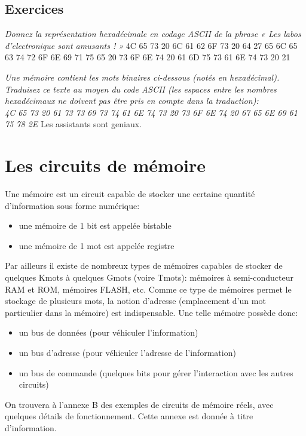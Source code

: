\subsection{Exercices}
{
\textit{Donnez la représentation hexadécimale en codage ASCII de la phrase « Les labos d’electronique sont amusants ! »}
}
{%
4C 65 73 20 6C 61 62 6F 73 20 64 27 65 6C 65 63 74 72 6F 6E 69 71 75 65 20 73 6F 6E 74 20 61 6D 75 73 61 6E 74 73 20 21
}

{
\textit{Une mémoire contient les mots binaires ci-dessous (notés en hexadécimal). Traduisez ce texte au moyen du code ASCII (les espaces entre les nombres hexadécimaux ne doivent pas être pris en compte dans la traduction):\\
4C 65 73 20 61 73 73 69 73 74 61 6E 74 73 20 73 6F 6E 74 20 67 65 6E 69 61 75 78 2E}
}
{%
Les assistants sont geniaux.
}


\section{Les circuits de mémoire}
Une mémoire est un circuit capable de stocker une certaine quantité d'information sous forme numérique:
\begin{itemize}
\item une mémoire de 1 bit est appelée bistable
\item une mémoire de 1 mot est appelée registre
\end{itemize}

Par ailleurs il existe de nombreux types de mémoires capables de stocker de quelques Kmots à quelques Gmots (voire Tmots): mémoires à semi-conducteur RAM et ROM, mémoires FLASH, etc. Comme ce type de mémoires permet le stockage de plusieurs mots, la notion d'adresse (emplacement d'un mot particulier dans la mémoire) est indispensable. Une telle mémoire possède donc:
\begin{itemize}
\item un bus de données (pour véhiculer l'information)
\item un bus d'adresse (pour véhiculer l'adresse de l'information)
\item un bus de commande (quelques bits pour gérer l'interaction avec les autres circuits)
\end{itemize}
On trouvera à l'annexe B des exemples de circuits de mémoire réels, avec quelques détails de fonctionnement. Cette annexe est donnée à titre d'information.

